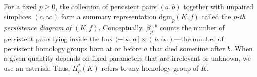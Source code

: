 For a fixed $p \geq 0$, the collection of persistent pairs $(a, b)$ together with unpaired simplices $(c, \infty)$ form a summary representation $\mathrm{dgm}_p(K,f)$ called the \emph{$p$-th persistence diagram of $(K,f)$}. Conceptually, $\beta_p^{a,b}$ counts the number of persistent pairs lying inside the box $(-\infty, a\,] \times (\,b, \infty)$---the number of persistent homology groups born at or before $a$ that died sometime after $b$. %
When a given quantity depends on fixed parameters that are irrelevant or unknown, we use an asterisk. Thus, $H_p^\ast(K)$ refers to any homology group of $K$. 




